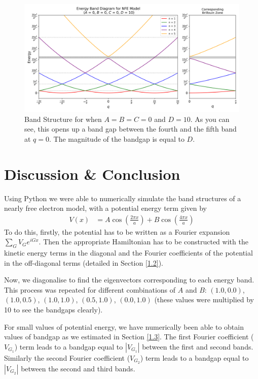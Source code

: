 \documentclass[12pt,a4paper]{article}
\begin{document}
\begin{figure}[H]
    \centering
    \includegraphics[width=1\linewidth]{images/g4.png}
    \caption{Band Structure for when $A=B=C=0$ and $D=10$. As you can see, this opens up a band gap between the fourth and the fifth band at $q=0$. The magnitude of the bandgap is equal to $D$.}
    \label{g4}
\end{figure}

\section{Discussion \& Conclusion}
Using Python we were able to numerically simulate the band structures of a nearly free electron model, with a potential energy term given by
\begin{align*}
    V(x) &= A\cos\left(\frac{2\pi x}{a}\right) + B\cos\left(\frac{4\pi x}{a}\right)
\end{align*}
To do this, firstly, the potential has to be written as a Fourier expansion $\sum_G V_G e^{iGx}$. Then the appropriate Hamiltonian has to be constructed with the kinetic energy terms in the diagonal and the Fourier coefficients of the potential in the off-diagonal terms (detailed in Section \ref{1.2}).

Now, we diagonalise to find the eigenvectors corresponding to each energy band. This process was repeated for different combinations of $A$ and $B$: $(1.0, 0.0)$, $(1.0,0.5)$, $(1.0,1.0)$, $(0.5,1.0)$, $(0.0,1.0)$ (these values were multiplied by 10 to see the bandgaps clearly).  

For small values of potential energy, we have numerically been able to obtain values of bandgap as we estimated in Section \ref{1.3}. The first Fourier coefficient ($V_{G_1}$) term leads to a bandgap equal to $|V_{G_1}|$ between the first and second bands. Similarly the second Fourier coefficient ($V_{G_2}$) term leads to a bandgap equal to $|V_{G_2}|$ between the second and third bands.
\end{document}
